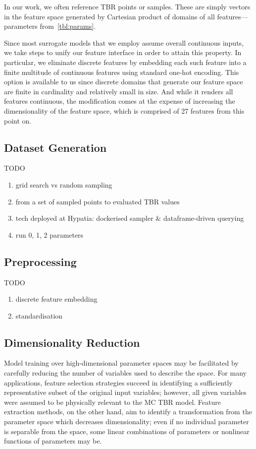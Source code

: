In our work, we often reference TBR points or samples. These are simply vectors
in the feature space generated by Cartesian product of domains of all
features---parameters from~\cref{tbl:params}.

Since most surrogate models
that we employ assume overall continuous inputs, we take steps to unify our
feature interface in order to attain this property. In particular, we eliminate
discrete features by embedding each such feature into a finite multitude of
continuous features using standard one-hot encoding. This option is available to
us since discrete domains that generate our feature space are finite in
cardinality and relatively small in size. And while it renders all features continuous, the
modification comes at the expense of increasing the dimensionality of the
feature space, which is comprised of 27 features from this point on.


\subsection{Dataset Generation}
\label{sec:dataset-generation}

TODO
\begin{enumerate}
	\item grid search vs random sampling
	\item from a set of sampled points to evaluated TBR values
	\item tech deployed at Hypatia: dockerised sampler \& dataframe-driven querying
	\item run 0, 1, 2 parameters
\end{enumerate}


\subsection{Preprocessing}
\label{sec:preprocessing}

TODO
\begin{enumerate}
	\item discrete feature embedding
	\item standardisation
\end{enumerate}


\subsection{Dimensionality Reduction}
\label{sec:dimred}

Model training over high-dimensional parameter spaces may be facilitated by carefully reducing the number of variables used to describe the space. For many applications, feature selection strategies succeed in identifying a sufficiently representative subset of the original input variables; however, all given variables were assumed to be physically relevant to the MC TBR model. Feature extraction methods, on the other hand, aim to identify a transformation from the parameter space which decreases dimensionality; even if no individual parameter is separable from the space, some linear combinations of parameters or nonlinear functions of parameters may be.

